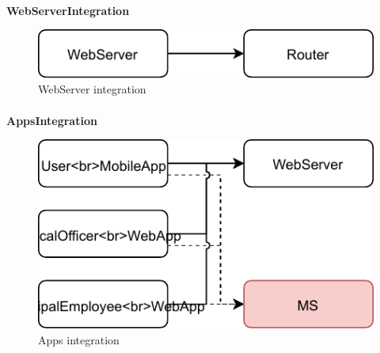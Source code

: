 			\paragraph{}
				\textbf{WebServerIntegration}
					\begin{figure}
						\centering
						\includegraphics[width=\textwidth]{images/Integration/WebServerIntegration.pdf}
						\caption{WebServer integration}
					\end{figure}
			\paragraph{}
				\textbf{AppsIntegration}
					\begin{figure}
						\centering
						\includegraphics[width=\textwidth]{images/Integration/AppsIntegration.pdf}
						\caption{Apps integration}
					\end{figure}